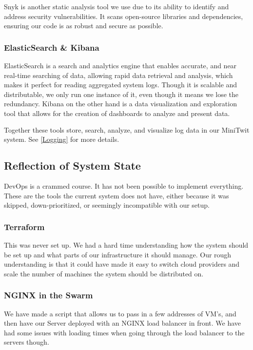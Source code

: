 Snyk is another static analysis tool we use due to its ability to identify and address security vulnerabilities. It scans open-source libraries and dependencies, ensuring our code is as robust and secure as possible.

\subsubsection{ElasticSearch \& Kibana}
ElasticSearch is a search and analytics engine that enables accurate, and near real-time searching of data, allowing rapid data retrieval and analysis, which makes it perfect for reading aggregated system logs. Though it is scalable and distributable, we only run one instance of it, even though it means we lose the redundancy. Kibana on the other hand is a data visualization and exploration tool that allows for the creation of dashboards to analyze and present data. 

Together these tools store, search, analyze, and visualize log data in our MiniTwit system. See \ref{Logging} for more details.

\subsection{Reflection of System State}

DevOps is a crammed course. It has not been possible to implement everything. These are the tools the current system does not have, either because it was skipped, down-prioritized, or seemingly incompatible with our setup.  

\subsubsection{Terraform}
This was never set up. We had a hard time understanding how the system should be set up and what parts of our infrastructure it should manage. Our rough understanding is that it could have made it easy to switch cloud providers and scale the number of machines the system should be distributed on. 

\subsubsection{NGINX in the Swarm}
We have made a script that allows us to pass in a few addresses of VM's, and then have our Server deployed with an NGINX load balancer in front. We have had some issues with loading times when going through the load balancer to the servers though.  

